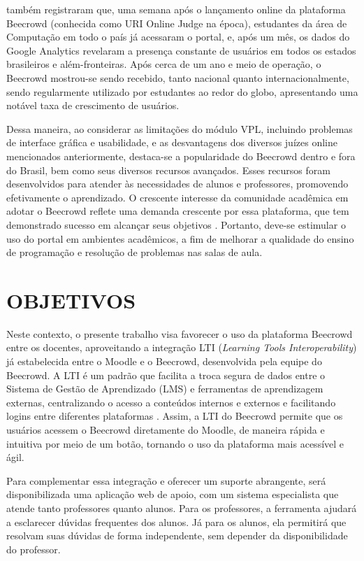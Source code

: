 \textcite[p.~248]{beztonin2014} também registraram que, uma semana após o lançamento online da plataforma Beecrowd (conhecida como URI Online Judge na época), estudantes da área de Computação em todo o país já acessaram o portal, e, após um mês, os dados do Google Analytics revelaram a presença constante de usuários em todos os estados brasileiros e além-fronteiras. Após cerca de um ano e meio de operação, o Beecrowd mostrou-se sendo recebido, tanto nacional quanto internacionalmente, sendo regularmente utilizado por estudantes ao redor do globo, apresentando uma notável taxa de crescimento de usuários. 

Dessa maneira, ao considerar as limitações do módulo VPL, incluindo problemas de interface gráfica e usabilidade, e as desvantagens dos diversos juízes online mencionados anteriormente, destaca-se a popularidade do Beecrowd dentro e fora do Brasil, bem como seus diversos recursos avançados. Esses recursos foram desenvolvidos para atender às necessidades de alunos e professores, promovendo efetivamente o aprendizado. O crescente interesse da comunidade acadêmica em adotar o Beecrowd reflete uma demanda crescente por essa plataforma, que tem demonstrado sucesso em alcançar seus objetivos \cite[p.~31]{ferreira2022}. Portanto, deve-se estimular o uso do portal em ambientes acadêmicos, a fim de melhorar a qualidade do ensino de programação e resolução de problemas nas salas de aula.

\section{OBJETIVOS}

Neste contexto, o presente trabalho visa favorecer o uso da plataforma Beecrowd entre os docentes, aproveitando a integração LTI (\textit{Learning Tools Interoperability}) já estabelecida entre o Moodle e o Beecrowd, desenvolvida pela equipe do Beecrowd. A LTI é um padrão que facilita a troca segura de dados entre o Sistema de Gestão de Aprendizado (LMS) e ferramentas de aprendizagem externas, centralizando o acesso a conteúdos internos e externos e facilitando logins entre diferentes plataformas \cite{verdaguer}. Assim, a LTI do Beecrowd permite que os usuários acessem o Beecrowd diretamente do Moodle, de maneira rápida e intuitiva por meio de um botão, tornando o uso da plataforma mais acessível e ágil.

Para complementar essa integração e oferecer um suporte abrangente, será disponibilizada uma aplicação web de apoio, com um sistema especialista que atende tanto professores quanto alunos. Para os professores, a ferramenta ajudará a esclarecer dúvidas frequentes dos alunos. Já para os alunos, ela permitirá que resolvam suas dúvidas de forma independente, sem depender da disponibilidade do professor.

